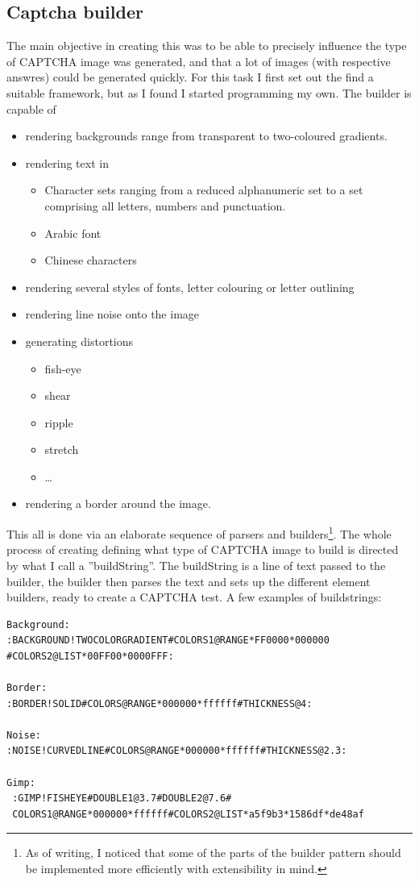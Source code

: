 \documentclass[pdftex,a4paper,12pt,twoside]{report}
\theoremstyle{plain} \newtheorem{theorem}{Theorem} \newtheorem{proposition}{Proposition} \newtheorem{lemma}{Lemma} \newtheorem*{corollary}{Corollary}
\theoremstyle{definition} \newtheorem{definition}{Definition} \newtheorem{conjecture}{Conjecture} \newtheorem*{example}{Example} \newtheorem{algorithm}{Algorithm}
\theoremstyle{remark} \newtheorem*{remark}{Remark} \newtheorem*{note}{Note} \newtheorem{case}{Case}
\begin{document}
\subsection{Captcha builder}
The main objective in creating this was to be able to precisely influence the type of CAPTCHA image was generated, and that a lot of images (with respective answres) could be generated quickly. For this task I first set out the find a suitable framework, but as I found I started programming my own. The builder is capable of
\begin{itemize}
\item rendering backgrounds range from transparent to two-coloured gradients.
\item rendering text in
	\begin{itemize}
	\item Character sets ranging from a reduced alphanumeric set to a set comprising all letters, numbers and punctuation.
	\item Arabic font
	\item Chinese characters
	\end{itemize}
\item rendering several styles of fonts, letter colouring or letter outlining
\item rendering line noise onto the image
\item generating distortions
	\begin{itemize}
	\item fish-eye
	\item shear
	\item ripple
	\item stretch
	\item \ldots
	\end{itemize}
\item rendering a border around the image.
\end{itemize}
This all is done via an elaborate sequence of parsers and builders\footnote{As of writing, I noticed that some of the parts of the builder pattern should be implemented more efficiently with extensibility in mind.}. The whole process of creating defining what type of CAPTCHA image to build is directed by what I call a ''buildString''. The buildString is a line of text passed to the builder, the builder then parses the text and sets up the different element builders, ready to create a CAPTCHA test. A few examples of buildstrings: 
\begin{verbatim}
Background:
:BACKGROUND!TWOCOLORGRADIENT#COLORS1@RANGE*FF0000*000000
#COLORS2@LIST*00FF00*0000FFF:

Border:
:BORDER!SOLID#COLORS@RANGE*000000*ffffff#THICKNESS@4:

Noise:
:NOISE!CURVEDLINE#COLORS@RANGE*000000*ffffff#THICKNESS@2.3:

Gimp:
 :GIMP!FISHEYE#DOUBLE1@3.7#DOUBLE2@7.6#
 COLORS1@RANGE*000000*ffffff#COLORS2@LIST*a5f9b3*1586df*de48af
\end{verbatim}
\end{document}
